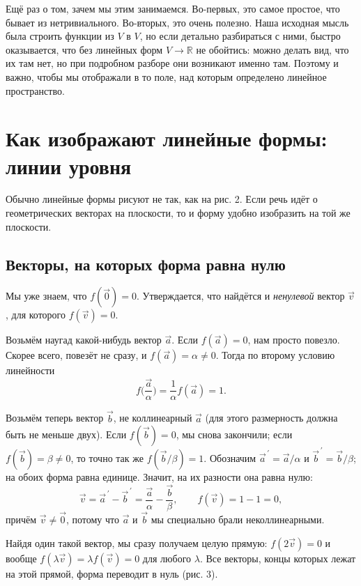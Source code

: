 \documentclass[11pt,a4paper]{article}
\begin{document}
Ещё раз о том, зачем мы этим занимаемся. Во-первых, это самое простое, что бывает из нетривиального. Во-вторых, это очень полезно. Наша исходная мысль была строить функции из $V$ в $V$, но если детально разбираться с ними, быстро оказывается, что без линейных форм $V \to \mathbb{R}$ не обойтись: можно делать вид, что их там нет, но при подробном разборе они возникают именно там. Поэтому и важно, чтобы мы отображали в то поле, над которым определено линейное пространство.

\section{Как изображают линейные формы: линии уровня}

Обычно линейные формы рисуют не так, как на рис. 2. Если речь идёт о геометрических векторах на плоскости, то и форму удобно изобразить на той же плоскости.

\subsection{Векторы, на которых форма равна нулю}

Мы уже знаем, что $f(\vec 0) = 0$. Утверждается, что найдётся и \emph{ненулевой} вектор $\vec v$, для которого $f(\vec v) = 0$.

Возьмём наугад какой-нибудь вектор $\vec a$. Если $f(\vec a) = 0$, нам просто повезло. Скорее всего, повезёт не сразу, и $f(\vec a) = \alpha \neq 0$. Тогда по второму условию линейности
\[
f\Big(\frac{\vec a}{\alpha}\Big) = \frac{1}{\alpha} f(\vec a) = 1.
\]

Возьмём теперь вектор $\vec b$, не коллинеарный $\vec a$ (для этого размерность должна быть не меньше двух). Если $f(\vec b) = 0$, мы снова закончили; если $f(\vec b) = \beta \neq 0$, то точно так же $f(\vec b/\beta) = 1$. Обозначим $\vec a^{\,\prime} = \vec a/\alpha$ и $\vec b^{\,\prime} = \vec b/\beta$; на обоих форма равна единице. Значит, на их разности она равна нулю:
\[
\vec v = \vec a^{\,\prime} - \vec b^{\,\prime} = \frac{\vec a}{\alpha} - \frac{\vec b}{\beta}, \qquad f(\vec v) = 1 - 1 = 0,
\]
причём $\vec v \neq \vec 0$, потому что $\vec a$ и $\vec b$ мы специально брали неколлинеарными.

Найдя один такой вектор, мы сразу получаем целую прямую: $f(2\vec v) = 0$ и вообще $f(\lambda \vec v) = \lambda f(\vec v) = 0$ для любого $\lambda$. Все векторы, концы которых лежат на этой прямой, форма переводит в нуль (рис. 3).
\end{document}
